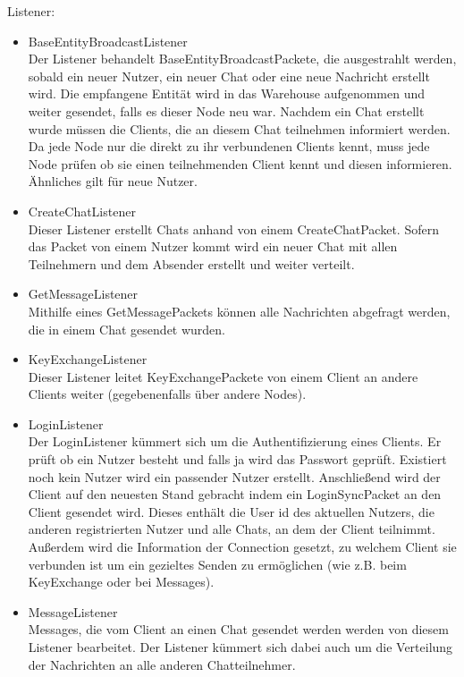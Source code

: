     Listener:
    \begin{itemize}
        \item BaseEntityBroadcastListener\\
            Der Listener behandelt BaseEntityBroadcastPackete, die ausgestrahlt werden, sobald ein neuer Nutzer, ein neuer Chat oder eine neue Nachricht erstellt wird. Die empfangene Entität wird in das Warehouse aufgenommen und weiter gesendet, falls es dieser Node neu war.
            Nachdem ein Chat erstellt wurde müssen die Clients, die an diesem Chat teilnehmen informiert werden. Da jede Node nur die direkt zu ihr verbundenen Clients kennt, muss jede Node prüfen ob sie einen teilnehmenden Client kennt und diesen informieren. Ähnliches gilt für neue Nutzer.
        \item CreateChatListener\\
            Dieser Listener erstellt Chats anhand von einem CreateChatPacket. Sofern das Packet von einem Nutzer kommt wird ein neuer Chat mit allen Teilnehmern und dem Absender erstellt und weiter verteilt.
        \item GetMessageListener\\
            Mithilfe eines GetMessagePackets können alle Nachrichten abgefragt werden, die in einem Chat gesendet wurden.
        \item KeyExchangeListener\\
            Dieser Listener leitet KeyExchangePackete von einem Client an andere Clients weiter (gegebenenfalls über andere Nodes).
        \item LoginListener\\
            Der LoginListener kümmert sich um die Authentifizierung eines Clients. Er prüft ob ein Nutzer besteht und falls ja wird das Passwort geprüft. Existiert noch kein Nutzer wird ein passender Nutzer erstellt. Anschließend wird der Client auf den neuesten Stand gebracht indem ein LoginSyncPacket an den Client gesendet wird. Dieses enthält die User id des aktuellen Nutzers, die anderen registrierten Nutzer und alle Chats, an dem der Client teilnimmt. Außerdem wird die Information der Connection gesetzt, zu welchem Client sie verbunden ist um ein gezieltes Senden zu ermöglichen (wie z.B. beim KeyExchange oder bei Messages).
        \item MessageListener\\
            Messages, die vom Client an einen Chat gesendet werden werden von diesem Listener bearbeitet. Der Listener kümmert sich dabei auch um die Verteilung der Nachrichten an alle anderen Chatteilnehmer.

\end{itemize}

